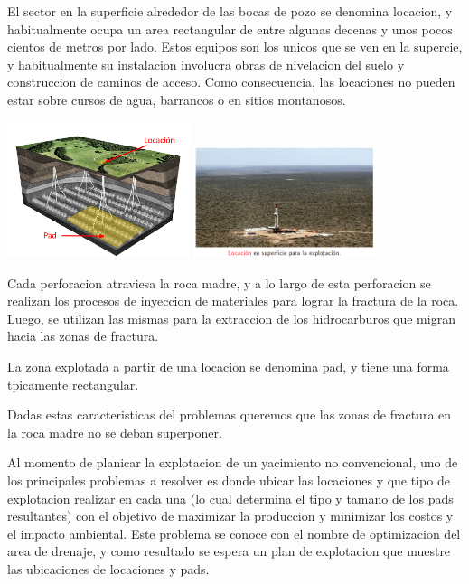 \newpage
El sector en la superficie alrededor de las bocas de pozo se denomina locacion, y habitualmente ocupa un area rectangular de entre algunas decenas y unos pocos cientos de metros por lado. Estos equipos son los unicos que se ven en la supercie, y habitualmente su instalacion involucra obras de nivelacion del suelo y construccion de caminos de acceso. Como consecuencia, las locaciones no pueden estar sobre cursos de agua, barrancos o en sitios montanosos.

\begin{center}
\includegraphics[width=0.4\textwidth]{imagenes/figura2}
\includegraphics[width=0.4\textwidth]{imagenes/figura3}
\end{center}

Cada perforacion atraviesa la roca madre, y a lo largo de esta perforacion
se realizan los procesos de inyeccion de materiales para lograr la fractura de
la roca. Luego, se utilizan las mismas para la extraccion de los hidrocarburos
que migran hacia las zonas de fractura.

La zona
explotada a partir de una locacion se denomina pad, y tiene una forma tpicamente
rectangular.

Dadas estas caracteristicas del problemas queremos que las zonas de fractura en la roca madre no se deban superponer.


Al momento de planicar la explotacion de un yacimiento no convencional,
uno de los principales problemas a resolver es donde ubicar las locaciones y
que tipo de explotacion realizar en cada una (lo cual determina el tipo y
tamano de los pads resultantes) con el objetivo de maximizar la produccion
y minimizar los costos y el impacto ambiental. Este problema se conoce con
el nombre de optimizacion del area de drenaje, y como resultado se espera un
plan de explotacion que muestre las ubicaciones de locaciones y pads.


